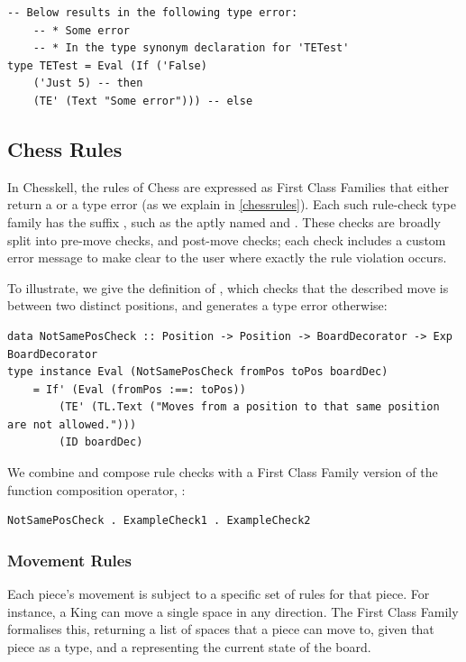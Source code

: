\begin{lstlisting}
-- Below results in the following type error:
    -- * Some error
    -- * In the type synonym declaration for 'TETest'
type TETest = Eval (If ('False)
    ('Just 5) -- then
    (TE' (Text "Some error"))) -- else
\end{lstlisting}

\subsection{Chess Rules}

In Chesskell, the rules of Chess are expressed as First Class Families that either return a  or a type error (as we explain in \cref{chessrules}). Each such rule-check type family has the suffix , such as the aptly named  and . These checks are broadly split into pre-move checks, and post-move checks; each check includes a custom error message to make clear to the user where exactly the rule violation occurs.

To illustrate, we give the definition of , which checks that the described move is between two distinct positions, and generates a type error otherwise:

\begin{lstlisting}
data NotSamePosCheck :: Position -> Position -> BoardDecorator -> Exp BoardDecorator
type instance Eval (NotSamePosCheck fromPos toPos boardDec)
    = If' (Eval (fromPos :==: toPos))
        (TE' (TL.Text ("Moves from a position to that same position are not allowed.")))
        (ID boardDec)
\end{lstlisting}

We combine and compose rule checks with a First Class Family version of the function composition operator, :

\begin{lstlisting}
NotSamePosCheck . ExampleCheck1 . ExampleCheck2
\end{lstlisting}

\subsubsection{Movement Rules}

Each piece's movement is subject to a specific set of rules for that piece. For instance, a King can move a single space in any direction. The  First Class Family formalises this, returning a list of spaces that a piece can move to, given that piece as a  type, and a  representing the current state of the board.

